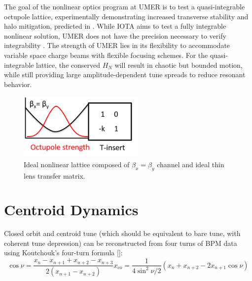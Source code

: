 The goal of the nonlinear optics program at UMER is to test a quasi-integrable octupole lattice, experimentally demonstrating increased transverse stability and halo mitigation, predicted in \cite{Webb}. While IOTA aims to test a fully integrable nonlinear solution, UMER does not have the precision necessary to verify integrability \cite{ipac12}. The strength of UMER lies in its flexibility to accommodate variable space charge beams with flexible focusing schemes. For the quasi-integrable lattice, the conserved $H_N$ will result in chaotic but bounded motion, while still providing large amplitude-dependent tune spreads to reduce resonant behavior.


\begin{figure}[!htb]
   \centering
   \includegraphics*[width=174pt]{gen.figures/toy_model}
   \caption{Ideal nonlinear lattice composed of $\beta_x = \beta_y$ channel and ideal thin lens transfer matrix.}
   \label{iota}
\end{figure}









\section{Centroid Dynamics}




Closed orbit and centroid tune (which should be equivalent to bare tune, with coherent tune depression) can be reconstructed from four turns of BPM data using Koutchouk's four-turn formula [\cite{Koutchouk}]:
\begin{subequations}
\begin{equation}
\label{}
\cos \nu = \frac{x_n - x_{n+1} + x_{n+2} - x_{n+3}}{2(x_{n+1}-x_{n+2})}
\end{equation}
\begin{equation}
\label{}
x_{co} = \frac{1}{4\sin ^2 \nu/2}(x_n+x_{n+2}-2x_{n+1}\cos \nu)
\end{equation}
\end{subequations}

